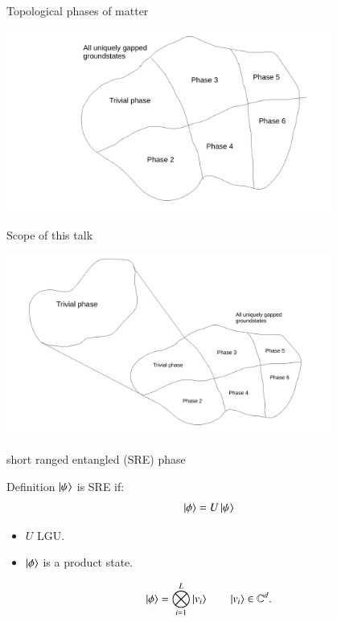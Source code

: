 \documentclass{beamer}
\begin{document}
\begin{frame}{Topological phases of matter}
	\begin{center}
		\includegraphics[trim={6cm 0 2.5cm 0},clip,width=0.8\textwidth]{Figures/GappedPhasesOfQuantumMatter.pdf}
	\end{center}
\end{frame}

\begin{frame}{Scope of this talk}
	\begin{center}
		\includegraphics[trim={1.5cm 0 2cm 0},clip,width=0.8\textwidth]{Figures/TrivialGappedPhaseOfQuantumMatter.pdf}
	\end{center}
\end{frame}

\begin{frame}{short ranged entangled (SRE) phase}
	\begin{center}
		
	\end{center}
	\pause
	\begin{block}{Definition}
		$\ket{\psi}$ is SRE if:
		\[\ket{\phi}=U\ket{\psi}\]
		\begin{itemize}
			\item $U$ LGU.
			\item $\ket{\phi}$ is a product state.
		\end{itemize}
	\end{block}
	\pause
	\[\ket{\phi}=\bigotimes_{i=1}^L\ket{v_i}\qquad \ket{v_i}\in\mathbb{C}^d.\]
\end{frame}
\end{document}
